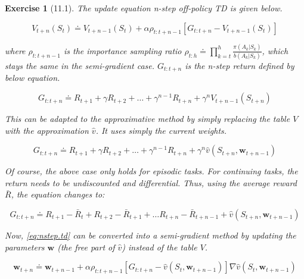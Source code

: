 \documentclass[a4paper]{scrartcl}
\theoremstyle{nonumberplain}
\newtheorem{ex}{Exercise}
\begin{document}
\begin{ex}[11.1]

The update equation n-step off-policy TD is given below.

\begin{equation}
\label{eq:nstep.td}
V_{t+n}(S_t) \doteq V_{t+n-1}(S_t) + \alpha \rho_{t:t+n-1}[G_{t:t+n} - V_{t+n-1}(S_t)]
\end{equation}

where $\rho_{t:t+n-1}$ is the importance sampling ratio $\rho_{t:h} \doteq \prod_{k=t}^{h} \frac{\pi(A_k|S_k)}{b(A_k|S_k)}$, which stays the same in the semi-gradient case. $G_{t:t+n}$ is the n-step return defined by below equation.

\begin{equation}
G_{t:t+n} \doteq R_{t+1} + \gamma R_{t+2} + \dots + \gamma^{n-1} R_{t+n} + \gamma^n V_{t+n-1}(S_{t+n})
\end{equation}

This can be adapted to the approximative method by simply replacing the table $V$ with the approximation $\hat{v}$. It uses simply the current weights.

\begin{equation}
\label{eq:nstep.return}
G_{t:t+n} \doteq R_{t+1} + \gamma R_{t+2} + \dots + \gamma^{n-1} R_{t+n} + \gamma^n\hat{v}(S_{t+n},\mathbf{w}_{t+n-1})
\end{equation}

Of course, the above case only holds for episodic tasks. For continuing tasks, the return needs to be undiscounted and differential. Thus, using the average reward $\bar{R}$, the equation changes to:

\begin{equation}
G_{t:t+n} \doteq R_{t+1} - \bar{R}_{t} + R_{t+2} - \bar{R}_{t+1} + \dots R_{t+n} - \bar{R}_{t+n-1} + \hat{v}(S_{t+n},\mathbf{w}_{t+n-1})
\end{equation}

Now, \autoref{eq:nstep.td} can be converted into a semi-gradient method by updating the parameters $\mathbf{w}$ (the free part of $\hat{v}$) instead of the table $V$.

\begin{equation}
\mathbf{w}_{t+n} \doteq \mathbf{w}_{t+n-1} + \alpha \rho_{t:t+n-1} [G_{t:t+n} - \hat{v}(S_t, \mathbf{w}_{t+n-1})]\nabla \hat{v}(S_t,\mathbf{w}_{t+n-1})
\end{equation}

\end{ex}
\end{document}
